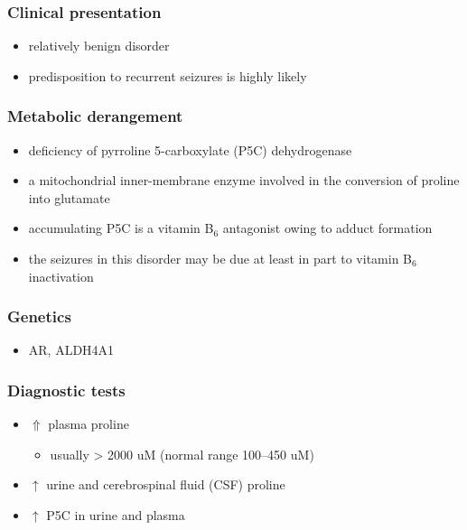 \documentclass{scrartcl}
\begin{document}
\subsubsection{Clinical presentation}
\label{sec:orga032c3a}
\begin{itemize}
\item relatively benign disorder
\item predisposition to recurrent seizures is highly likely
\end{itemize}
\subsubsection{Metabolic derangement}
\label{sec:orgfe1e523}
\begin{itemize}
\item deficiency of pyrroline 5-carboxylate (P5C) dehydrogenase
\item a mitochondrial inner-membrane enzyme involved in the conversion of
proline into glutamate
\end{itemize}
\begin{itemize}
\item accumulating P5C is a vitamin B\(_{\text{6}}\) antagonist owing to adduct
formation
\item the seizures in this disorder may be due at least in part to vitamin
B\(_{\text{6}}\) inactivation
\end{itemize}


\subsubsection{Genetics}
\label{sec:org9d34840}
\begin{itemize}
\item AR, ALDH4A1
\end{itemize}

\subsubsection{Diagnostic tests}
\label{sec:org7b37f6f}
\begin{itemize}
\item \(\Uparrow\) plasma proline
\begin{itemize}
\item usually \textgreater{} 2000 uM (normal range 100–450 uM)
\end{itemize}
\item \(\uparrow\) urine and cerebrospinal fluid (CSF) proline
\item \(\uparrow\) P5C in urine and plasma
\end{itemize}
\end{document}
